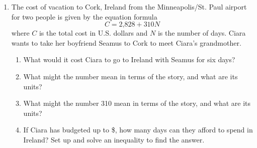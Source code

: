\begin{enumerate}
\item  The cost of vacation to Cork, Ireland from the Minneapolis/St. Paul airport for two people is given by the equation formula $$C = \text{2,828} + 310N$$ where $C$ is the total cost in U.S. dollars and $N$ is the number of days.  Ciara wants to take her boyfriend Seamus to Cork to meet Ciara's grandmother.
\begin{enumerate}
\item What would it cost Ciara to go to Ireland with Seamus for six days?
\item What might the number  mean in terms of the story, and what are its units?
\item What might the number 310 mean in terms of the story, and what are its units?
\item  If Ciara has budgeted up to \$, how many days can they afford to spend in Ireland? Set up and solve an inequality to find the answer.
\end{enumerate}

\end{enumerate}


